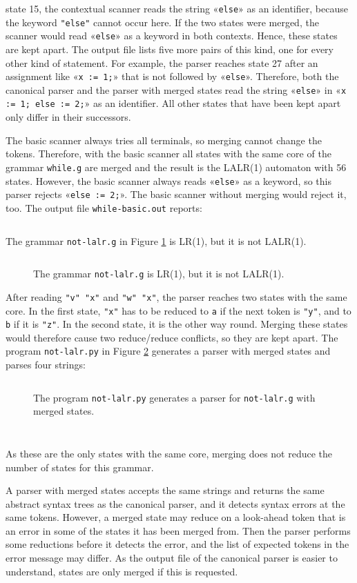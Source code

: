 \documentclass[11pt,a4paper]{article}
\newenvironment{unbreakable}{\par\noindent\begin{minipage}{\linewidth}}{\end{minipage}\par}
\newcommand{\codefigure}[5][]{\begin{figure}[H]%
  \inputminted[numbers = left, numbersep = 0.3cm, #1]{#2}{examples/#3}%
  \vspace*{-0.3cm}%
  \caption{#5}\label{#4}\end{figure}}
\newcommand{\grammarfile}[2]{\codefigure{larkita_lexer.py:LarkitaLexer}{#1}{fig:#1}{#2}}
\newcommand{\pythonfile}[2]{\codefigure{python3}{#1}{fig:#1}{#2}}
\newcommand{\resultfile}[2][\normalsize]{\begin{unbreakable}%
  \inputminted[fontsize = #1, breaklines]{text}{examples/output/#2.txt}\end{unbreakable}}
\begin{document}
state 15, the contextual scanner reads the string «\texttt{else}» as an identifier, because the keyword
\verb|"else"| cannot occur here.  If the two states were merged, the scanner would read «\texttt{else}» as a
keyword in both contexts.  Hence, these states are kept apart.  The output file lists five more pairs of
this kind, one for every other kind of statement.  For example, the parser reaches state 27 after an
assignment like «\verb|x := 1;|» that is not followed by «\verb|else|».  Therefore, both the canonical parser
and the parser with merged states read the string «\texttt{else}» in «\verb|x := 1; else := 2;|» as an
identifier.  All other states that have been kept apart only differ in their successors.

The basic scanner always tries all terminals, so merging cannot change the tokens.  Therefore, with the basic
scanner all states with the same core of the grammar \texttt{while.g} are merged and the result is the
LALR(1) automaton with 56 states.  However, the basic scanner always reads «\texttt{else}» as a keyword, so this
parser rejects «\verb|else := 2;|».  The basic scanner without merging would reject it, too.  The output file
\texttt{while-basic.out} reports:
\resultfile[\small]{while-basic}
The grammar \texttt{not-lalr.g} in Figure \ref{fig:not-lalr.g} is LR(1), but it is not LALR(1).
\grammarfile{not-lalr.g}{The grammar \texttt{not-lalr.g} is LR(1), but it is not LALR(1).}
After reading \verb|"v" "x"| and \verb|"w" "x"|, the parser reaches two states with the same core.  In the first
state, \verb|"x"| has to be reduced to \texttt{a} if the next token is \verb|"y"|, and to \texttt{b} if it is
\verb|"z"|.  In the second state, it is the other way round.  Merging these states would therefore cause two
reduce/reduce conflicts, so they are kept apart.  The program \texttt{not-lalr.py} in Figure
\ref{fig:not-lalr.py} generates a parser with merged states and parses four strings:
\pythonfile{not-lalr.py}{The program \texttt{not-lalr.py} generates a parser for \texttt{not-lalr.g} with
  merged states.}
\resultfile{not-lalr}
\resultfile[\small]{not-lalr-merged}
As these are the only states with the same core, merging does not reduce the number of states for this
grammar.

A parser with merged states accepts the same strings and returns the same abstract syntax trees as the
canonical parser, and it detects syntax errors at the same tokens.  However, a merged state may reduce on a
look-ahead token that is an error in some of the states it has been merged from.  Then the parser performs
some reductions before it detects the error, and the list of expected tokens in the error message may
differ.  As the output file of the canonical parser is easier to understand, states are only merged if this
is requested.
\end{document}
